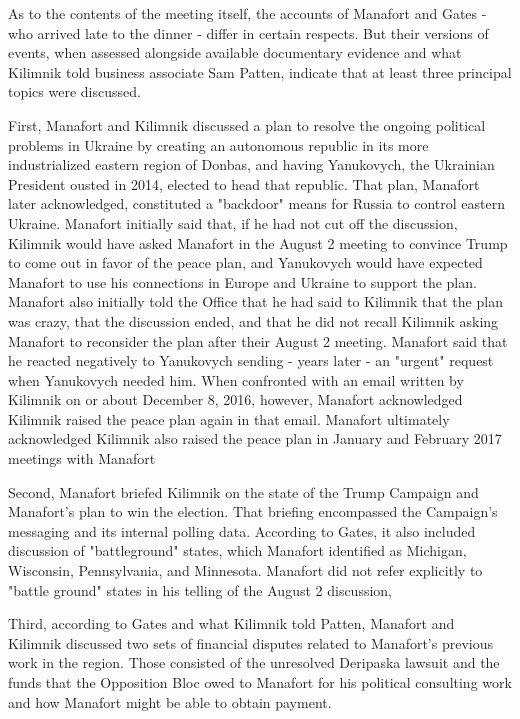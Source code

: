 As to the contents of the meeting itself, the accounts of Manafort and Gates - who arrived late to the dinner - differ in certain respects.
But their versions of events, when assessed alongside available documentary evidence and what Kilimnik told business associate Sam Patten, indicate that at least three principal topics were discussed.

First, Manafort and Kilimnik discussed a plan to resolve the ongoing political problems in Ukraine by creating an autonomous republic in its more industrialized eastern region of Donbas,%
and having Yanukovych, the Ukrainian President ousted in 2014, elected to head that republic.%
That plan, Manafort later acknowledged, constituted a "backdoor" means for Russia to control eastern Ukraine.%
Manafort initially said that, if he had not cut off the discussion, Kilimnik would have asked Manafort in the August 2 meeting to convince Trump to come out in favor of the peace plan, and Yanukovych would have expected Manafort to use his connections in Europe and Ukraine to support the plan.%
Manafort also initially told the Office that he had said to Kilimnik that the plan was crazy, that the discussion ended, and that he did not recall Kilimnik asking Manafort to reconsider the plan after their August 2 meeting.%
Manafort said
that he reacted negatively to Yanukovych sending - years later - an "urgent" request when Yanukovych needed him.%
When confronted with an email written by Kilimnik on or about December 8, 2016, however, Manafort acknowledged Kilimnik raised the peace plan again in that email.%
Manafort ultimately acknowledged Kilimnik also raised the peace plan in January and February 2017 meetings with Manafort

Second, Manafort briefed Kilimnik on the state of the Trump Campaign and Manafort's plan to win the election.%
That briefing encompassed the Campaign's messaging and its internal polling data.
According to Gates, it also included discussion of "battleground" states, which Manafort identified as Michigan, Wisconsin, Pennsylvania, and Minnesota.%
Manafort did not refer explicitly to "battle ground" states in his telling of the August 2 discussion,

Third, according to Gates and what Kilimnik told Patten, Manafort and Kilimnik discussed two sets of financial disputes related to Manafort's previous work in the region.
Those consisted of the unresolved Deripaska lawsuit and the funds that the Opposition Bloc owed to Manafort for his political consulting work and how Manafort might be able to obtain payment.%

